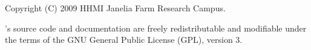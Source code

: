 \vspace*{\fill}
\begin{flushleft}
Copyright (C) 2009 HHMI Janelia Farm Research Campus.

\vspace{2em} 

's source code and documentation are freely
redistributable and modifiable under the terms of the GNU General
Public License (GPL), version 3.
\end{flushleft}
